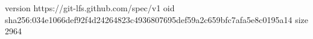 version https://git-lfs.github.com/spec/v1
oid sha256:034e1066def92f4d24264823c4936807695def59a2c659bfc7afa5e8c0195a14
size 2964

